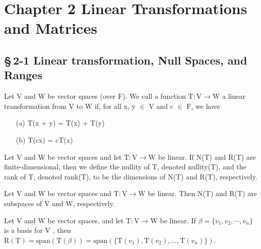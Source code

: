
\linespread{1.6} %
\parindent=0pt %

	\section*{Chapter 2 Linear Transformations and Matrices}	
	\subsection*{\S\,2-1 Linear transformation, Null Spaces, and Ranges}
\begin{defn}
$ $\\	Let $\mathrm{V}$ and $\mathrm{W}$ be vector spaces (over $\mathrm{F}$). We call a function $\mathrm{T}: \mathrm{V}  \rightarrow  \mathrm{W}$    a linear transformation from $\mathrm{V}$ to $\mathrm{W}$ if, for all x, y $\in$ $\mathrm{V}$ and c $\in$ $\mathrm{F}$, we have

\begin{enumerate}
	\item [(a)]   $\mathrm{T}$(x + y) = $\mathrm{T}$(x) + $\mathrm{T}$(y) 
	\item [(b)]    $\mathrm{T}$($\mathrm{c}$x) = $\mathrm{c}\mathrm{T}$(x)
\end{enumerate} 
\end{defn}

\begin{defn}
$ $\\	Let $\mathrm{V}$ and $\mathrm{W}$ be vector spaces and let $\mathrm{T}: \mathrm{V}  \rightarrow  \mathrm{W}$ be linear. If N(T) and R(T) are finite-dimensional, then we define the nullity of T, denoted nullity(T), and the rank of T, denoted rank(T), to be the dimensions of N(T) and R(T), respectively.
\end{defn}

\begin{thm*}
$ $ \\ 	Let V and W be vector spaces and $\mathrm{T}: \mathrm{V}  \rightarrow  \mathrm{W}$ be linear. Then N(T) and R(T) are subspaces of $\mathrm{V}$ and $\mathrm{W}$, respectively.
\end{thm*}

\begin{thm*}
$ $\\
 Let V and W be vector spaces, and let $\mathrm{T} : \mathrm{V}  \rightarrow \mathrm{W}$ be linear. If $\beta = \{ v_1,v_2,\cdots,v_n \}$ is a basis for $\mathrm{V}$ , then $ \mathrm{R}(\mathrm{T}) = \mathrm{span}(\mathrm{T}(\beta)) = \mathrm{span}(\{\mathrm{T}(v_1), \mathrm{T}(v_2), . . . , \mathrm{T}(v_n)\})$.

\end{thm*}

